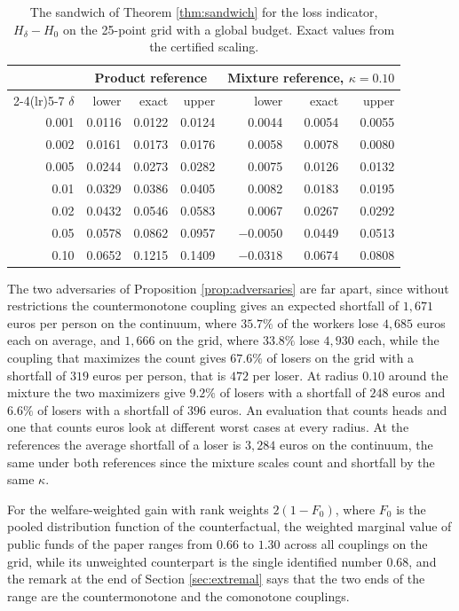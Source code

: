 \documentclass[11pt,a4paper]{article}
\theoremstyle{notesplain}
\theoremstyle{notesupright}
\numberwithin{equation}{section}
\begin{document}
\begin{table}[h]
\centering\small
\begin{tabular}{rrrrrrr}
\toprule
& \multicolumn{3}{c}{Product reference} & \multicolumn{3}{c}{Mixture reference, $\kappa=0.10$}\\
\cmidrule(lr){2-4}\cmidrule(lr){5-7}
$\delta$ & lower & exact & upper & lower & exact & upper\\
\midrule
0.001 & 0.0116 & 0.0122 & 0.0124 & 0.0044 & 0.0054 & 0.0055\\
0.002 & 0.0161 & 0.0173 & 0.0176 & 0.0058 & 0.0078 & 0.0080\\
0.005 & 0.0244 & 0.0273 & 0.0282 & 0.0075 & 0.0126 & 0.0132\\
0.01 & 0.0329 & 0.0386 & 0.0405 & 0.0082 & 0.0183 & 0.0195\\
0.02 & 0.0432 & 0.0546 & 0.0583 & 0.0067 & 0.0267 & 0.0292\\
0.05 & 0.0578 & 0.0862 & 0.0957 & $-0.0050$ & 0.0449 & 0.0513\\
0.10 & 0.0652 & 0.1215 & 0.1409 & $-0.0318$ & 0.0674 & 0.0808\\
\bottomrule
\end{tabular}
\caption{The sandwich of Theorem \ref{thm:sandwich} for the loss indicator, $H_\delta-H_0$ on the 25-point grid with a global budget. Exact values from the certified scaling.}
\label{tab:sandwich}
\end{table}

The two adversaries of Proposition \ref{prop:adversaries} are far apart, since without restrictions the countermonotone coupling gives an expected shortfall of $1{,}671$ euros per person on the continuum, where $35.7\%$ of the workers lose $4{,}685$ euros each on average, and $1{,}666$ on the grid, where $33.8\%$ lose $4{,}930$ each, while the coupling that maximizes the count gives $67.6\%$ of losers on the grid with a shortfall of $319$ euros per person, that is $472$ per loser. At radius $0.10$ around the mixture the two maximizers give $9.2\%$ of losers with a shortfall of $248$ euros and $6.6\%$ of losers with a shortfall of $396$ euros. An evaluation that counts heads and one that counts euros look at different worst cases at every radius. At the references the average shortfall of a loser is $3{,}284$ euros on the continuum, the same under both references since the mixture scales count and shortfall by the same $\kappa$.

For the welfare-weighted gain with rank weights $2(1-F_0)$, where $F_0$ is the pooled distribution function of the counterfactual, the weighted marginal value of public funds of the paper ranges from $0.66$ to $1.30$ across all couplings on the grid, while its unweighted counterpart is the single identified number $0.68$, and the remark at the end of Section \ref{sec:extremal} says that the two ends of the range are the countermonotone and the comonotone couplings.
\end{document}
